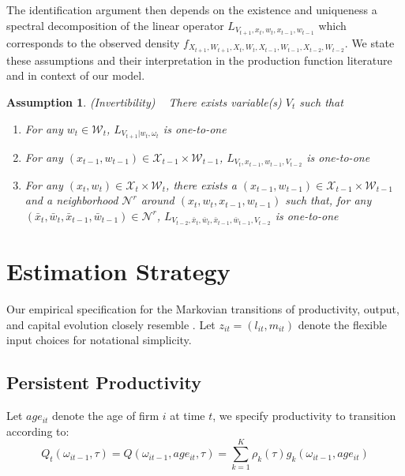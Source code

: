 \documentclass{article}
\newtheorem{assump}{Assumption}[section]
\begin{document}
The identification argument then depends on the existence and uniqueness a spectral decomposition of the linear operator $L_{V_{t+1},x_{t}, w_{t}, x_{t-1}, w_{t-1}}$ which corresponds to the observed density $f_{X_{t+1}, W_{t+1}, X_{t}, W_{t}, X_{t-1}, W_{t-1}, X_{t-2}, W_{t-2}}$. We state these assumptions and their interpretation in the production function literature and in context of our model.

\begin{assump}(Invertibility)
~
There exists variable(s) $V_{t}$ such that
    \begin{enumerate}[label=\alph*)]
    \item For any $w_{t}\in \mathcal{W}_{t}$, $L_{V_{t+1}|w_{t}, \omega_{t}}$ is one-to-one
    \item For any $(x_{t-1}, w_{t-1})\in \mathcal{X}_{t-1}\times\mathcal{W}_{t-1}$, $L_{V_{t}, x_{t-1}, w_{t-1}, V_{t-2}}$ is one-to-one
    \item For any $(x_{t}, w_{t})\in \mathcal{X}_{t}\times\mathcal{W}_{t}$, there exists a $(x_{t-1}, w_{t-1})\in \mathcal{X}_{t-1}\times\mathcal{W}_{t-1}$ and a neighborhood $\mathcal{N}^{r}$ around $(x_{t}, w_{t}, x_{t-1}, w_{t-1})$ such that, for any $(\bar{x}_{t}, \bar{w}_{t}, \bar{x}_{t-1}, \bar{w}_{t-1})\in \mathcal{N}^{r}$, $L_{V_{t-2}, \bar{x}_{t}, \bar{w}_{t}, \bar{x}_{t-1}, \bar{w}_{t-1}, V_{t-2}}$ is one-to-one
    \end{enumerate}
\end{assump}



\section{Estimation Strategy}

Our empirical specification for the Markovian transitions of productivity, output, and capital evolution closely resemble \cite{Arellano2017}. Let $z_{it}=(l_{it}, m_{it})$ denote the flexible input choices for notational simplicity.

\subsection{Persistent Productivity}
Let $age_{it}$ denote the age of firm $i$ at time $t$, we specify productivity to transition according to:
\begin{equation}\label{omegamodel}
Q_{t}(\omega_{it-1}, \tau)=Q(\omega_{it-1}, age_{it}, \tau)=\sum_{k=1}^{K}\rho_{k}(\tau)g_{k}(\omega_{it-1}, age_{it})
\end{equation}
\end{document}
